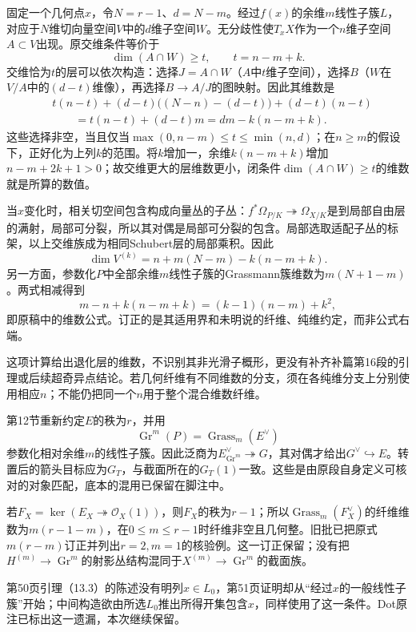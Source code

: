 固定一个几何点$x$，令$N=r-1$、$d=N-m$。经过$f(x)$的余维$m$线性子簇$L$，对应于$N$维切向量空间$V$中的$d$维子空间$W$。无分歧性使$T_xX$作为一个$n$维子空间$A\subset V$出现。原交维条件等价于
\[
\dim(A\cap W)\geq t,\qquad t=n-m+k.
\]
交维恰为$t$的层可以依次构造：选择$J=A\cap W$（$A$中$t$维子空间），选择$B$（$W$在$V/A$中的$(d-t)$维像），再选择$B\to A/J$的图映射。因此其维数是
\begin{align*}
&t(n-t)+(d-t)\bigl((N-n)-(d-t)\bigr)+(d-t)(n-t)\\
&\hspace{2em}=t(n-t)+(d-t)m
=dm-k(n-m+k).
\end{align*}
这些选择非空，当且仅当$\max(0,n-m)\leq t\leq\min(n,d)$；在$n\geq m$的假设下，正好化为上列$k$的范围。将$k$增加一，余维$k(n-m+k)$增加$n-m+2k+1>0$；故交维更大的层维数更小，闭条件$\dim(A\cap W)\geq t$的维数就是所算的数值。

当$x$变化时，相关切空间包含构成向量丛的子丛：$f^*\Omega_{P/K}\twoheadrightarrow\Omega_{X/K}$是到局部自由层的满射，局部可分裂，所以其对偶是局部可分裂的包含。局部选取适配子丛的标架，以上交维族成为相同Schubert层的局部乘积。因此
\[
\dim V^{(k)}=n+m(N-m)-k(n-m+k).
\]
另一方面，参数化$P$中全部余维$m$线性子簇的Grassmann簇维数为$m(N+1-m)$。两式相减得到
\[
m-n+k(n-m+k)=(k-1)(n-m)+k^2,
\]
即原稿中的维数公式。订正的是其适用界和未明说的纤维、纯维约定，而非公式右端。

这项计算给出退化层的维数，不识别其非光滑子概形，更没有补齐补篇第16段的引理或后续超奇异点结论。若几何纤维有不同维数的分支，须在各纯维分支上分别使用相应$n$；不能仍把同一个$n$用于整个混合维数纤维。

第12节重新约定$E$的秩为$r$，并用
\[
\operatorname{Gr}^{m}(P)=\operatorname{Grass}_m(E^\vee)
\]
参数化相对余维$m$的线性子簇。因此泛商为$E^\vee_{\operatorname{Gr}^{m}}\twoheadrightarrow G$，其对偶才给出$G^\vee\hookrightarrow E$。转置后的箭头目标应为$G_T$，与截面所在的$G_T(1)$一致。这些是由原段自身定义可核对的对象匹配，底本的混用已保留在脚注中。

若$F_X=\ker(E_X\twoheadrightarrow\mathcal O_X(1))$，则$F_X$的秩为$r-1$；所以$\operatorname{Grass}_m(F_X^\vee)$的纤维维数为$m(r-1-m)$，在$0\leq m\leq r-1$时纤维非空且几何整。旧批已把原式$m(r-m)$订正并列出$r=2,m=1$的核验例。这一订正保留；没有把$H^{(m)}\to\operatorname{Gr}^{m}$的射影丛结构混同于$X^{(m)}\to\operatorname{Gr}^{m}$的截面族。

第50页引理（13.3）的陈述没有明列$x\in L_0$，第51页证明却从“经过$x$的一般线性子簇”开始；中间构造欲由所选$L_0$推出所得开集包含$x$，同样使用了这一条件。Dot原注已标出这一遗漏，本次继续保留。

